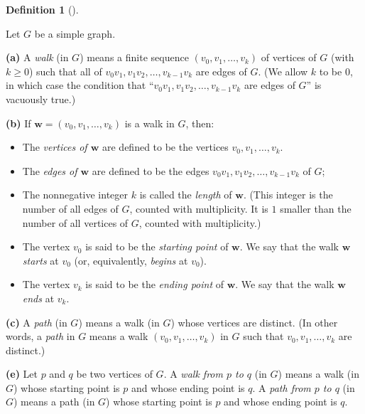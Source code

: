\documentclass[numbers=enddot,12pt,final,onecolumn,notitlepage]{scrartcl}%
\theoremstyle{definition}
\newtheorem{defi}[theo]{Definition}
\newenvironment{definition}[1][]
{\begin{defi}[#1]\begin{leftbar}}
{\end{leftbar}\end{defi}}
\newcommand{\tup}[1]{\left( #1 \right)}
\begin{document}
\begin{definition} \label{def.intro.walks}
Let $G$ be a simple graph.

\textbf{(a)} A \textit{walk} (in $G$) means a finite sequence
$\tup{v_0, v_1, \ldots, v_k}$ of vertices of $G$ (with $k \geq 0$)
such that all of
$v_0 v_1, v_1 v_2, \ldots, v_{k-1} v_k$ are edges of $G$. (We allow
$k$ to be $0$, in which case the condition that
``$v_0 v_1, v_1 v_2, \ldots, v_{k-1} v_k$ are edges of $G$'' is
vacuously true.)

\textbf{(b)} If $\mathbf{w} = \tup{v_0, v_1, \ldots, v_k}$ is a walk
in $G$, then:

\begin{itemize}
\item The \textit{vertices of $\mathbf{w}$} are defined to be
the vertices $v_0, v_1, \ldots, v_k$.
\item The
\textit{edges of $\mathbf{w}$} are defined to be the edges
$v_0 v_1, v_1 v_2, \ldots, v_{k-1} v_k$ of $G$;
\item The nonnegative integer $k$ is called the
\textit{length} of $\mathbf{w}$. (This integer is the number of all
edges of $G$, counted with multiplicity. It is $1$ smaller than the
number of all vertices of $G$, counted with multiplicity.)
\item The vertex $v_0$ is said to be the \textit{starting point} of
$\mathbf{w}$. We say that the walk $\mathbf{w}$ \textit{starts} at
$v_0$ (or, equivalently, \textit{begins} at $v_0$).
\item The vertex $v_k$ is said to be the \textit{ending point} of
$\mathbf{w}$. We say that the walk $\mathbf{w}$ \textit{ends} at
$v_k$.
\end{itemize}

\textbf{(c)} A \textit{path} (in $G$) means a walk (in $G$) whose
vertices are distinct. (In other words, a \textit{path} in $G$ means
a walk $\tup{v_0, v_1, \ldots, v_k}$ in $G$ such that
$v_0, v_1, \ldots, v_k$ are distinct.)

\textbf{(e)} Let $p$ and $q$ be two vertices of $G$. A
\textit{walk from $p$ to $q$} (in $G$) means a walk (in $G$) whose
starting point is $p$ and whose ending point is $q$. A
\textit{path from $p$ to $q$} (in $G$) means a path (in $G$) whose
starting point is $p$ and whose ending point is $q$.
\end{definition}
\end{document}
